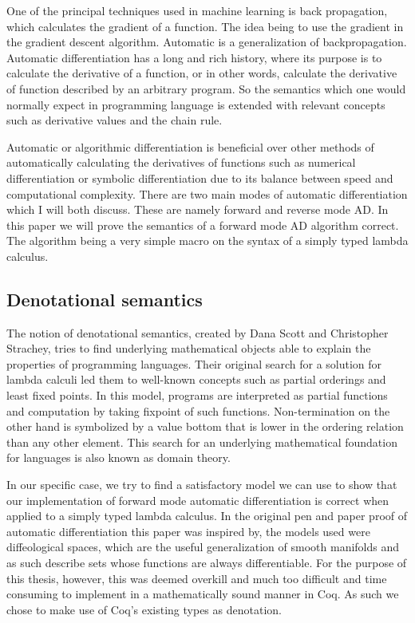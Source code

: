 \documentclass[a4, 12pt, final]{article}
\begin{document}

One of the principal techniques used in machine learning is back propagation, which calculates the gradient of a function. The idea being to use the gradient in the gradient descent algorithm\cite{Baydin2015AutomaticDI}. Automatic is a generalization of backpropagation. Automatic differentiation has a long and rich history, where its purpose is to calculate the derivative of a function, or in other words, calculate the derivative of function described by an arbitrary program. So the semantics which one would normally expect in programming language is extended with relevant concepts such as derivative values and the chain rule.

Automatic or algorithmic differentiation is beneficial over other methods of automatically calculating the derivatives of functions such as numerical differentiation or symbolic differentiation due to its balance between speed and computational complexity. There are two main modes of automatic differentiation which I will both discuss. These are namely forward and reverse mode AD. In this paper we will prove the semantics of a forward mode AD algorithm correct. The algorithm being a very simple macro on the syntax of a simply typed lambda calculus.


\subsection{Denotational semantics}

The notion of denotational semantics, created by Dana Scott and Christopher Strachey\cite{}, tries to find underlying mathematical objects able to explain the properties of programming languages. Their original search for a solution for lambda calculi led them to well-known concepts such as partial orderings and least fixed points. In this model, programs are interpreted as partial functions and computation by taking fixpoint of such functions. Non-termination on the other hand is symbolized by a value bottom that is lower in the ordering relation than any other element. This search for an underlying mathematical foundation for languages is also known as domain theory.

In our specific case, we try to find a satisfactory model we can use to show that our implementation of forward mode automatic differentiation is correct when applied to a simply typed lambda calculus. In the original pen and paper proof of automatic differentiation this paper was inspired by, the models used were diffeological spaces, which are the useful generalization of smooth manifolds and as such describe sets whose functions are always differentiable. For the purpose of this thesis, however, this was deemed overkill and much too difficult and time consuming to implement in a mathematically sound manner in Coq. As such we chose to make use of Coq's existing types as denotation.
\end{document}
